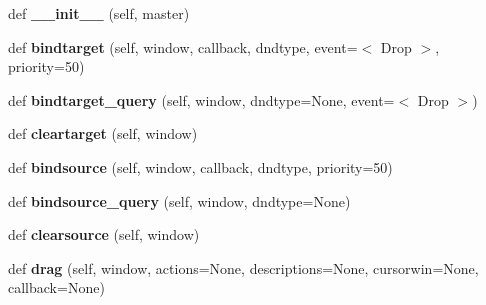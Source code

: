 \begin{DoxyCompactItemize}
\item 
\mbox{\label{classlib_1_1_tk_d_n_d__wrapper_1_1_tk_d_n_d_ab1f6586fe3ca735af2e666ab1b79cd91}} 
def {\bfseries \+\_\+\+\_\+init\+\_\+\+\_\+} (self, master)
\item 
\mbox{\label{classlib_1_1_tk_d_n_d__wrapper_1_1_tk_d_n_d_a771726554b471b369eb9eb532f679ceb}} 
def {\bfseries bindtarget} (self, window, callback, dndtype, event=\textquotesingle{}$<$ Drop $>$\textquotesingle{}, priority=50)
\item 
\mbox{\label{classlib_1_1_tk_d_n_d__wrapper_1_1_tk_d_n_d_a8da6ea0d3cb7dc52a688c963e5654cd9}} 
def {\bfseries bindtarget\+\_\+query} (self, window, dndtype=None, event=\textquotesingle{}$<$ Drop $>$\textquotesingle{})
\item 
\mbox{\label{classlib_1_1_tk_d_n_d__wrapper_1_1_tk_d_n_d_a4642cdae3da7b78feec74e892856caa0}} 
def {\bfseries cleartarget} (self, window)
\item 
\mbox{\label{classlib_1_1_tk_d_n_d__wrapper_1_1_tk_d_n_d_a1bd30ba5ad75251934bf73e9528a4bad}} 
def {\bfseries bindsource} (self, window, callback, dndtype, priority=50)
\item 
\mbox{\label{classlib_1_1_tk_d_n_d__wrapper_1_1_tk_d_n_d_a731dabbeedf84c1bcfc1072071ec6ddd}} 
def {\bfseries bindsource\+\_\+query} (self, window, dndtype=None)
\item 
\mbox{\label{classlib_1_1_tk_d_n_d__wrapper_1_1_tk_d_n_d_a12c370618fd1ccec6f13cc3312c40709}} 
def {\bfseries clearsource} (self, window)
\item 
\mbox{\label{classlib_1_1_tk_d_n_d__wrapper_1_1_tk_d_n_d_a7b6a58b8dbbec99dd821d8f91f0592cd}} 
def {\bfseries drag} (self, window, actions=None, descriptions=None, cursorwin=None, callback=None)
\end{DoxyCompactItemize}
